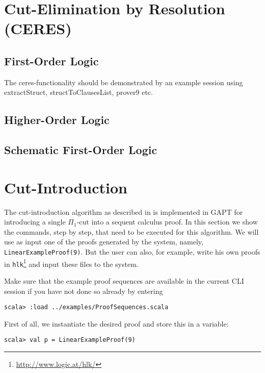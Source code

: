 \documentclass[a4paper,11pt]{article}
\newenvironment{meta}{\color{red}}{\color{black}}
\begin{document}
\section{Cut-Elimination by Resolution (CERES)}


\subsection{First-Order Logic}

\begin{meta}
The ceres-functionality should be demonstrated by an example
session using extractStruct, structToClausesList, prover9 etc.
\end{meta}


\subsection{Higher-Order Logic}


\subsection{Schematic First-Order Logic}


\section{Cut-Introduction}

The cut-introduction algorithm as described in \cite{HetzlXXAlgorithmic} is
implemented in GAPT for introducing a single $\Pi_1$-cut into a sequent calculus
proof. In this section we show the commands, step by step, that need to be
executed for this algorithm. We will use as input one of the proofs generated by
the system, namely, \texttt{LinearExampleProof(9)}. But the
user can also, for example, write his own proofs in
\texttt{hlk}\footnote{\url{http://www.logic.at/hlk/}} and input these files to
the system. 

Make sure that the example proof sequences are available in the current CLI
session if you have not done so already by entering
\begin{lstlisting}
scala> :load ../examples/ProofSequences.scala
\end{lstlisting}
%
First of all, we instantiate the desired proof and store this in a variable:
\begin{lstlisting}
scala> val p = LinearExampleProof(9) 
\end{lstlisting}
\end{document}
